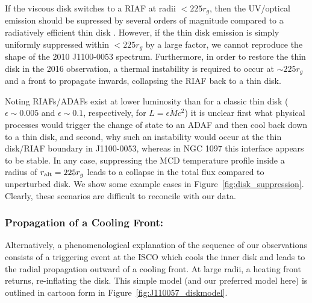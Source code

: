 \documentclass[a4paper,fleqn,usenatbib]{mnras}
\begin{document}
{If the viscous disk switches to a RIAF at radii $< 225 r_{g}$, then
the UV/optical emission should be supressed by several orders of
magnitude compared to a radiatively efficient thin disk
\citep{Narayan1998, Abramowicz2002, Abramowicz2013}. However, if the
thin disk emission is simply uniformly suppressed within $<225r_{g}$
by a large factor, we cannot reproduce the shape of the 2010
J1100-0053 spectrum. Furthermore, in order to restore the thin disk in
the 2016 observation, a thermal instability is required to occur at
$\sim 225r_{g}$ and a front to propagate inwards, collapsing the RIAF
back to a thin disk.

Noting RIAFs/ADAFs exist at lower luminosity than for a classic thin disk ($\epsilon \sim 0.005$ and $\epsilon \sim 0.1$, respectively, for $L=\epsilon \dot{M} c^{2}$) it is unclear first what physical processes would trigger the change of state to an ADAF and then cool back down to a thin disk, and second, why such an instability would occur at the thin disk/RIAF boundary in J1100-0053, whereas in NGC 1097 this interface appears to be stable. In any case, suppressing the MCD temperature profile inside a radius of $r_{{\rm alt}} = 225 r_{g}$ leads to a collapse in the total flux compared to unperturbed disk. We show some example cases in Figure~\ref{fig:disk_suppression}. Clearly, these scenarios are difficult to reconcile with our data.


\subsubsection{Propagation of a Cooling Front:}
Alternatively, a phenomenological explanation of the sequence of our
observations consists of a triggering event at the ISCO which cools
the inner disk and leads to the radial propagation outward of a
cooling front. At large radii, a heating front returns, re-inflating
the disk. This simple model (and our preferred model here) is outlined
in cartoon form in Figure~\ref{fig:J110057_diskmodel}.

}
\end{document}
